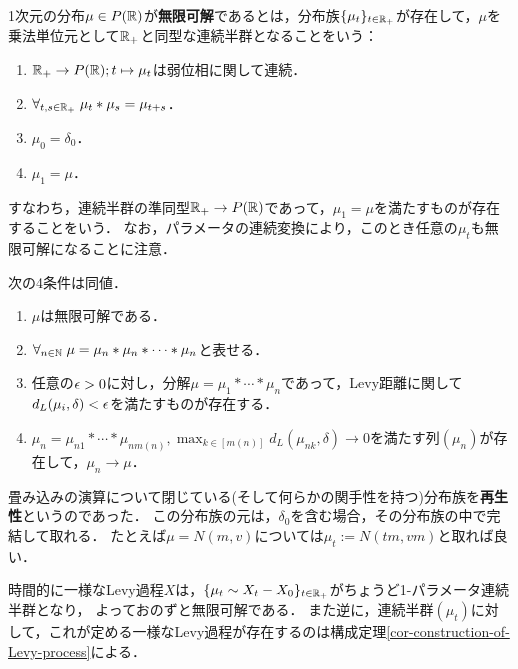 \documentclass[uplatex,dvipdfmx]{jsreport}
\begin{document}
\begin{definition}
    1次元の分布$\mu\in P(\mathbb{R})$が\textbf{無限可解}であるとは，分布族$\{\mu_t\}_{t\in\mathbb{R}_+}$が存在して，$\mu$を乗法単位元として$\mathbb{R}_+$と同型な連続半群となることをいう：
    \begin{enumerate}
        \item $\mathbb{R}_+\to P(\mathbb{R});t\mapsto\mu_t$は弱位相に関して連続．
        \item $\forall_{t,s\in\mathbb{R}_+}\;\mu_t*\mu_s=\mu_{t+s}$．
        \item $\mu_0=\delta_0$．
        \item $\mu_1=\mu$．
    \end{enumerate}
    すなわち，連続半群の準同型$\mathbb{R}_+\to P(\mathbb{R})$であって，$\mu_1=\mu$を満たすものが存在することをいう．
    なお，パラメータの連続変換により，このとき任意の$\mu_t$も無限可解になることに注意．
\end{definition}

\begin{lemma}[無限可解性の特徴付け]
    次の4条件は同値．
    \begin{enumerate}
        \item $\mu$は無限可解である．
        \item $\forall_{n\in\mathbb{N}}\;\mu=\mu_n*\mu_n*\cdots *\mu_n$と表せる．
        \item 任意の$\epsilon>0$に対し，分解$\mu=\mu_1*\cdots*\mu_n$であって，Levy距離に関して$d_L(\mu_i,\delta)<\epsilon$を満たすものが存在する．
        \item $\mu_n=\mu_{n1}*\cdots*\mu_{nm(n)},\max_{k\in[m(n)]}d_L(\mu_{nk},\delta)\to0$を満たす列$(\mu_n)$が存在して，$\mu_n\to\mu$．
    \end{enumerate}
\end{lemma}

\begin{example}
    畳み込みの演算について閉じている(そして何らかの関手性を持つ)分布族を\textbf{再生性}というのであった．
    この分布族の元は，$\delta_0$を含む場合，その分布族の中で完結して取れる．
    たとえば$\mu=N(m,v)$については$\mu_t:=N(tm,vm)$と取れば良い．
\end{example}

\begin{example}[時間的に一様なLevy過程]
    時間的に一様なLevy過程$X$は，$\{\mu_t\sim X_t-X_0\}_{t\in\mathbb{R}_+}$がちょうど1-パラメータ連続半群となり，
    よっておのずと無限可解である．
    また逆に，連続半群$(\mu_t)$に対して，これが定める一様なLevy過程が存在するのは構成定理\ref{cor-construction-of-Levy-process}による．
\end{example}
\end{document}
